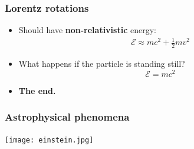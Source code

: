 \documentclass{beamer}
\begin{document}
\begin{frame}
  \frametitle{Lorentz rotations}
  \begin{itemize}
    \item<1-> Should have \textbf{non-relativistic} energy:
      \begin{gather*}
	\mathcal{  E}\approx mc^2+\frac{1}{2}mv^2
      \end{gather*}
    \item<2-> What happens if the particle is standing still?
      \begin{equation*}
	\mathcal{  E}=mc^2
      \end{equation*}
    \item<3-> \textbf{The end.}
  \end{itemize}
\end{frame}

\begin{frame}
  \center
  \frametitle{Astrophysical phenomena}
  \texttt{[image: einstein.jpg]}
\end{frame}
\end{document}
